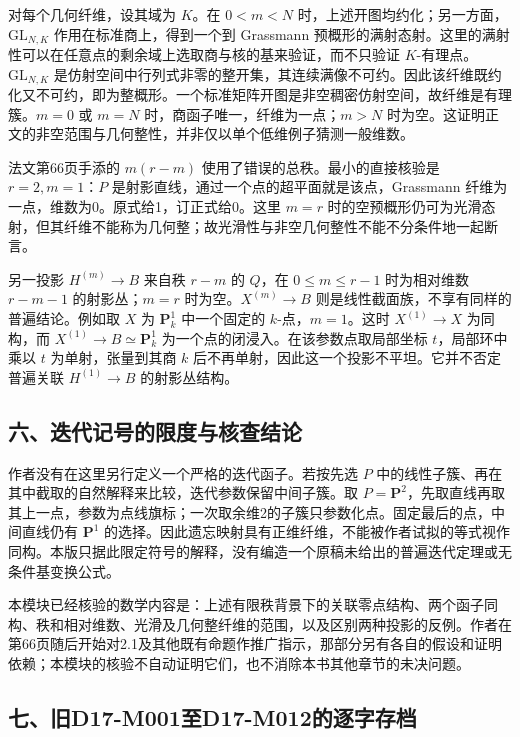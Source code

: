 \documentclass[UTF8,a4paper]{ctexbook}
\begin{document}
对每个几何纤维，设其域为 $K$。在 $0<m<N$ 时，上述开图均约化；另一方面，$\mathrm{GL}_{N,K}$ 作用在标准商上，得到一个到 Grassmann 预概形的满射态射。这里的满射性可以在任意点的剩余域上选取商与核的基来验证，而不只验证 $K$-有理点。$\mathrm{GL}_{N,K}$ 是仿射空间中行列式非零的整开集，其连续满像不可约。因此该纤维既约化又不可约，即为整概形。一个标准矩阵开图是非空稠密仿射空间，故纤维是有理簇。$m=0$ 或 $m=N$ 时，商函子唯一，纤维为一点；$m>N$ 时为空。这证明正文的非空范围与几何整性，并非仅以单个低维例子猜测一般维数。

法文第66页手添的 $m(r-m)$ 使用了错误的总秩。最小的直接核验是 $r=2,m=1$：$P$ 是射影直线，通过一个点的超平面就是该点，Grassmann 纤维为一点，维数为0。原式给1，订正式给0。这里 $m=r$ 时的空预概形仍可为光滑态射，但其纤维不能称为几何整；故光滑性与非空几何整性不能不分条件地一起断言。

另一投影 $H^{(m)}\to B$ 来自秩 $r-m$ 的 $Q$，在 $0\leq m\leq r-1$ 时为相对维数 $r-m-1$ 的射影丛；$m=r$ 时为空。$X^{(m)}\to B$ 则是线性截面族，不享有同样的普遍结论。例如取 $X$ 为 $\mathbf P^1_k$ 中一个固定的 $k$-点，$m=1$。这时 $X^{(1)}\to X$ 为同构，而 $X^{(1)}\to B\simeq\mathbf P^1_k$ 为一个点的闭浸入。在该参数点取局部坐标 $t$，局部环中乘以 $t$ 为单射，张量到其商 $k$ 后不再单射，因此这一个投影不平坦。它并不否定普遍关联 $H^{(1)}\to B$ 的射影丛结构。

\subsection*{六、迭代记号的限度与核查结论}

作者没有在这里另行定义一个严格的迭代函子。若按先选 $P$ 中的线性子簇、再在其中截取的自然解释来比较，迭代参数保留中间子簇。取 $P=\mathbf P^2$，先取直线再取其上一点，参数为点线旗标；一次取余维2的子簇只参数化点。固定最后的点，中间直线仍有 $\mathbf P^1$ 的选择。因此遗忘映射具有正维纤维，不能被作者试拟的等式视作同构。本版只据此限定符号的解释，没有编造一个原稿未给出的普遍迭代定理或无条件基变换公式。

本模块已经核验的数学内容是：上述有限秩背景下的关联零点结构、两个函子同构、秩和相对维数、光滑及几何整纤维的范围，以及区别两种投影的反例。作者在第66页随后开始对2.1及其他既有命题作推广指示，那部分另有各自的假设和证明依赖；本模块的核验不自动证明它们，也不消除本书其他章节的未决问题。

\subsection*{七、旧D17-M001至D17-M012的逐字存档}
\end{document}
